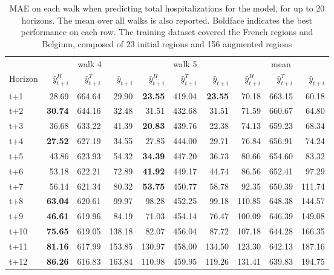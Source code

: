 \begin{table}[H]
\centering
\caption{MAE on each walk when predicting total hospitalizations for the model, for up to 20 horizons. The mean over all walks is also reported. Boldface indicates the best performance on each row. The training dataset covered the French regions and Belgium, composed of 23 initial regions and 156 augmented regions }
\label{tab:MAE_walk_assemble}
\begin{tabular}{lrrrrrrrrr}
\toprule
 & \multicolumn{3}{c}{walk 4} & \multicolumn{3}{c}{walk 5} & \multicolumn{3}{c}{mean} 
\\

\cmidrule(lr){2-4} \cmidrule(lr){5-7} \cmidrule(lr){8-10} 
Horizon & $\hat{y}_{t+i}^H$ & $\hat{y}_{t+i}^T$ & $\hat{y}_{t+i}$ & $\hat{y}_{t+i}^H$ & $\hat{y}_{t+i}^T$ & $\hat{y}_{t+i}$ & $\hat{y}_{t+i}^H$ & $\hat{y}_{t+i}^T$ & $\hat{y}_{t+i}$ \\
\midrule
t+1  & 28.69  & 664.64  & 29.90  & \textbf{23.55}  & 419.04  & \textbf{23.55}  & 70.18  & 663.15  & 60.18  \\
t+2  & \textbf{30.74}  & 644.16  & 32.48  & 31.51  & 432.68  & 31.51  & 71.59  & 660.67  & 64.80  \\
t+3  & 36.68  & 633.22  & 41.39  & \textbf{20.83}  & 439.76  & 22.38  & 74.13  & 659.23  & 68.34  \\
t+4  & \textbf{27.52}  & 627.19  & 34.55  & 27.85  & 444.00  & 29.71  & 76.84  & 656.91  & 74.24  \\
t+5  & 43.86  & 623.93  & 54.32  & \textbf{34.39}  & 447.20  & 36.73  & 80.66  & 654.60  & 83.32  \\
t+6  & 53.18  & 622.21  & 72.89  & \textbf{41.92}  & 449.17  & 44.74  & 86.56  & 652.41  & 97.29  \\
t+7  & 56.14  & 621.34  & 80.32  & \textbf{53.75}  & 450.77  & 58.78  & 92.35  & 650.39  & 111.74  \\
t+8  & \textbf{63.04}  & 620.61  & 99.97  & 98.28  & 452.25  & 99.18  & 110.85  & 648.38  & 144.57  \\
t+9  & \textbf{46.61}  & 619.96  & 84.19  & 71.03  & 454.14  & 76.47  & 100.09  & 646.39  & 149.08  \\
t+10  & \textbf{75.65}  & 619.05  & 138.18  & 82.07  & 456.04  & 87.72  & 107.18  & 644.28  & 166.35  \\
t+11  & \textbf{81.16}  & 617.99  & 153.85  & 130.97  & 458.00  & 134.50  & 123.30  & 642.13  & 187.16  \\
t+12  & \textbf{86.26}  & 616.83  & 163.84  & 110.98  & 459.95  & 119.26  & 131.41  & 639.83  & 194.75  \\

\end{tabular}
\end{table}
